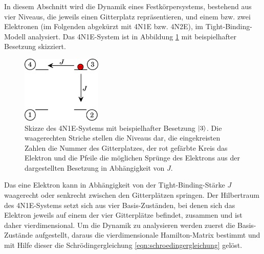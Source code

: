 In diesem Abschnitt wird die Dynamik eines Festkörpersystems, bestehend aus vier Niveaus, die jeweils einen Gitterplatz repräsentieren, und einem bzw. zwei Elektronen (im Folgenden abgekürzt mit 4N1E bzw. 4N2E),
im Tight-Binding-Modell analysiert. Das 4N1E-System ist in Abbildung \ref{fig:vierniveausystem} mit beispielhafter Besetzung skizziert.
\begin{figure}
  \centering
  \includegraphics[height = 3.2cm]{Graphiken/vier_niveau_system.pdf}
  \caption{Skizze des 4N1E-Systems mit beispielhafter Besetzung $\ket{3}$. Die waagerechten Striche stellen die Niveaus dar, die eingekreisten Zahlen die Nummer des Gitterplatzes, der rot gefärbte Kreis das Elektron
  und die Pfeile die möglichen Sprünge des Elektrons aus der dargestellten Besetzung in Abhängigkeit von $J$.}
  \label{fig:vierniveausystem}
\end{figure}
Das eine Elektron kann in Abhängigkeit von der Tight-Binding-Stärke $J$ waagerecht oder senkrecht zwischen den Gitterplätzen springen.
Der Hilbertraum des 4N1E-Systems setzt sich aus vier Basis-Zuständen, bei denen sich das Elektron jeweils auf einem der vier Gitterplätze befindet, zusammen und ist daher vierdimensional.
Um die Dynamik zu analysieren werden zuerst die Basis-Zustände aufgestellt, daraus die vierdimensionale Hamilton-Matrix bestimmt und mit Hilfe dieser die Schrödingergleichung \eqref{eqn:schroedingergleichung} gelöst.


